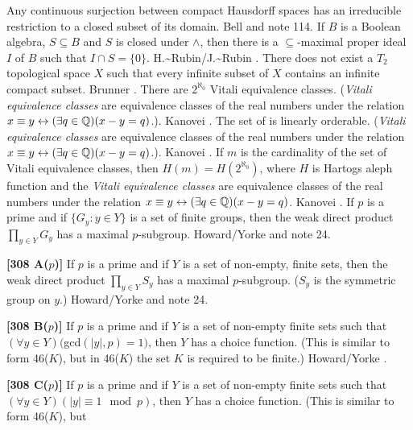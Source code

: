 \medskip
{} Any continuous surjection between compact
Hausdorff spaces has an irreducible restriction to a closed subset of
its domain.  \ac{Bell} \cite{1988} and note 114.
\medskip
{} If $B$ is a Boolean algebra, $S\subseteq B$ and
$S$ is closed under $\land$, then there is a $\subseteq$-maximal proper
ideal $I$ of $B$ such that $I\cap S= \{0\}$.  \ac{H.~Rubin/J.~Rubin}
\cite{1985}.
\medskip
{} There does not exist a $T_2$ topological space
$X$ such that every infinite subset of $X$ contains an infinite compact
subset. \ac{Brunner} \cite{1985c}.
\medskip
{} There are $2^{\aleph_0}$ Vitali equivalence
classes. ({\it Vitali equivalence classes} are equivalence classes of
the real numbers under the relation $x\equiv y\leftrightarrow(\exists
q\in{\Bbb Q})(x-y=q)$.). \ac{Kanovei} \cite{1991}.
\medskip
{} The set of  is
linearly orderable. ({\it Vitali equivalence classes} are equivalence
classes of the real numbers under the relation $x\equiv y\leftrightarrow
(\exists q\in{\Bbb Q})(x-y = q)$.). \ac{Kanovei} \cite{1991}.
\medskip
{} If $m$ is the cardinality of the set of
Vitali equivalence classes, then $H(m) = H(2^{\aleph_0})$, where $H$
is Hartogs aleph function and the {\it Vitali equivalence classes} are
equivalence classes of the real numbers under the relation
$x\equiv y\leftrightarrow(\exists q\in {\Bbb Q})(x-y=q)$. \ac{Kanovei}
\cite{1991}.
\medskip
{} If $p$ is a prime and if $\{G_y: y\in Y\}$
is a set of finite groups, then the weak direct product $\prod_{y\in Y}G_y$
has a maximal $p$-subgroup.  \ac{Howard/Yorke} \cite{1987}
and note 24.
\smallskip
\item{}{\bf [308 A($p$)]} If $p$ is a prime and if $Y$ is a set of
non-empty, finite sets, then the weak direct product $\prod_{y\in Y} S_y$
has a maximal $p$-subgroup. ($S_y$ is the symmetric group on $y$.)
\ac{Howard/Yorke} \cite{1987} and note 24.
\smallskip
\item{}{\bf [308 B($p$)]} If $p$ is a prime and if $Y$ is a set of
non-empty finite sets such that $(\forall y\in Y)($gcd$(|y|,p)=1)$, then
$Y$ has a choice function.  (This is similar to form 46($K$), but in
46($K$) the set $K$ is required to be finite.) \ac{Howard/Yorke}
\cite{1987}.
\smallskip
\item{}{\bf [308 C($p$)]} If $p$ is a prime and if $Y$ is a set of
non-empty finite sets such that $(\forall y\in Y)(|y|\equiv 1\mod p)$,
then $Y$ has a choice function. (This is similar to form 46($K$), but
